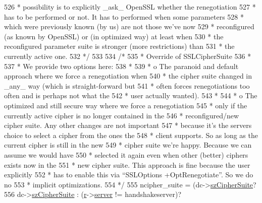\begin{DoxyCode}
{526 \textcolor{comment}{     * possibility is to explicitly \_ask\_ OpenSSL whether the renegotiation}
527 \textcolor{comment}{     * has to be performed or not. It has to performed when some parameters}
528 \textcolor{comment}{     * which were previously known (by us) are not those we've now}
529 \textcolor{comment}{     * reconfigured (as known by OpenSSL) or (in optimized way) at least when}
530 \textcolor{comment}{     * the reconfigured parameter suite is stronger (more restrictions) than}
531 \textcolor{comment}{     * the currently active one.}
532 \textcolor{comment}{     */}
533 
534     \textcolor{comment}{/*}
535 \textcolor{comment}{     * Override of SSLCipherSuite}
536 \textcolor{comment}{     *}
537 \textcolor{comment}{     * We provide two options here:}
538 \textcolor{comment}{     *}
539 \textcolor{comment}{     * o The paranoid and default approach where we force a renegotiation when}
540 \textcolor{comment}{     *   the cipher suite changed in \_any\_ way (which is straight-forward but}
541 \textcolor{comment}{     *   often forces renegotiations too often and is perhaps not what the}
542 \textcolor{comment}{     *   user actually wanted).}
543 \textcolor{comment}{     *}
544 \textcolor{comment}{     * o The optimized and still secure way where we force a renegotiation}
545 \textcolor{comment}{     *   only if the currently active cipher is no longer contained in the}
546 \textcolor{comment}{     *   reconfigured/new cipher suite. Any other changes are not important}
547 \textcolor{comment}{     *   because it's the servers choice to select a cipher from the ones the}
548 \textcolor{comment}{     *   client supports. So as long as the current cipher is still in the new}
549 \textcolor{comment}{     *   cipher suite we're happy. Because we can assume we would have}
550 \textcolor{comment}{     *   selected it again even when other (better) ciphers exists now in the}
551 \textcolor{comment}{     *   new cipher suite. This approach is fine because the user explicitly}
552 \textcolor{comment}{     *   has to enable this via ``SSLOptions +OptRenegotiate''. So we do no}
553 \textcolor{comment}{     *   implicit optimizations.}
554 \textcolor{comment}{     */}     
555     ncipher\_suite = (dc->\hyperlink{structSSLDirConfigRec_a48d61d7582a6886de0760b5ae3b31e22}{szCipherSuite}? 
556                      dc->\hyperlink{structSSLDirConfigRec_a48d61d7582a6886de0760b5ae3b31e22}{szCipherSuite} : (\hyperlink{group__APACHE__CORE__CONFIG_ga091cdd45984e865a888a4f8bb8fe107a}{r}->\hyperlink{structrequest__rec_a4a8059930ce9409cb885fdeef6921b7b}{server} != handshakeserver)?
}
\end{DoxyCode}
